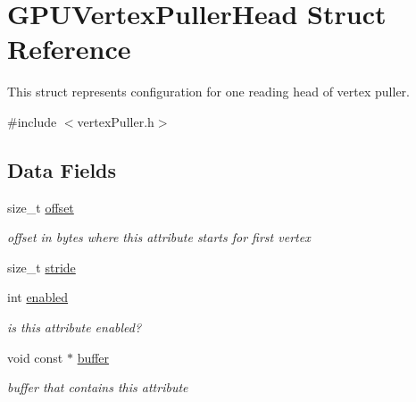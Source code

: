 \hypertarget{structGPUVertexPullerHead}{\section{G\-P\-U\-Vertex\-Puller\-Head Struct Reference}
\label{structGPUVertexPullerHead}
}


This struct represents configuration for one reading head of vertex puller.  




{\ttfamily \#include $<$vertex\-Puller.\-h$>$}

\subsection*{Data Fields}
\begin{DoxyCompactItemize}
\item 
\hypertarget{structGPUVertexPullerHead_a7131d0e0d5ec5e76c89459da5503fbeb}{size\-\_\-t \hyperlink{structGPUVertexPullerHead_a7131d0e0d5ec5e76c89459da5503fbeb}{offset}}\label{structGPUVertexPullerHead_a7131d0e0d5ec5e76c89459da5503fbeb}

\begin{DoxyCompactList}\small\item\em offset in bytes where this attribute starts for first vertex \end{DoxyCompactList}\item 
size\-\_\-t \hyperlink{structGPUVertexPullerHead_a9b48e3de1de5716c6e5e8ffa6fcc2753}{stride}
\item 
\hypertarget{structGPUVertexPullerHead_af0e62aaa41d6d4e134fef1a02624a592}{int \hyperlink{structGPUVertexPullerHead_af0e62aaa41d6d4e134fef1a02624a592}{enabled}}\label{structGPUVertexPullerHead_af0e62aaa41d6d4e134fef1a02624a592}

\begin{DoxyCompactList}\small\item\em is this attribute enabled? \end{DoxyCompactList}\item 
\hypertarget{structGPUVertexPullerHead_a7b348342bde17bc367d19e48e3476116}{void const $\ast$ \hyperlink{structGPUVertexPullerHead_a7b348342bde17bc367d19e48e3476116}{buffer}}\label{structGPUVertexPullerHead_a7b348342bde17bc367d19e48e3476116}

\begin{DoxyCompactList}\small\item\em buffer that contains this attribute \end{DoxyCompactList}\end{DoxyCompactItemize}


